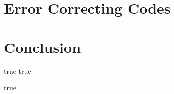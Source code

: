 \documentclass[a4paper,fleqn,english]{book}
\begin{document}
\chapter{Error Correcting Codes}

%
\chapter{Conclusion} \label{sec:txtConclusion}%
%
%
%
\nocite{*} %
\literaturverzeichnis%
{true} %
%
%
%
\bezeichnungenChapter%
{true} %
{}





\anhangstuff %
{true} %
{
%
}



%
%
%
%
%


\end{document}
